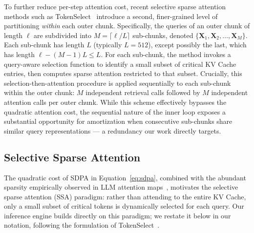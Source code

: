 \documentclass[10pt,conference]{IEEEtran}
\begin{document}
To further reduce per-step attention cost, recent selective sparse 
attention methods such as TokenSelect~\cite{tokenselect2025} introduce 
a second, finer-grained level of partitioning \textit{within} each 
outer chunk. Specifically, the queries of an outer chunk of length 
$\ell$ are subdivided into $M = \lceil \ell / L \rceil$ sub-chunks, 
denoted $\{\mathbf{X}_1, \mathbf{X}_2, \ldots, \mathbf{X}_M\}$. Each 
sub-chunk has length $L$ (typically $L = 512$), except possibly the 
last, which has length $\ell - (M-1)L \leq L$. For each sub-chunk, the 
method invokes a query-aware selection function to identify a small 
subset of critical KV Cache entries, then computes sparse attention 
restricted to that subset. Crucially, this selection-then-attention 
procedure is applied sequentially to each sub-chunk within 
the outer chunk: $M$ independent retrieval calls followed by $M$ 
independent attention calls per outer chunk. While this scheme 
effectively bypasses the quadratic attention cost, the sequential 
nature of the inner loop exposes a substantial opportunity for 
amortization when consecutive sub-chunks share similar query 
representations --- a redundancy our work directly targets.

\subsection{Selective Sparse Attention}
\label{subsec:problem-formulation}

The quadratic cost of SDPA in Equation~\eqref{eq:sdpa}, combined with
the abundant sparsity empirically observed in LLM attention
maps~\cite{xiao2024infllm, tang2024quest, tokenselect2025}, motivates
the selective sparse attention (SSA) paradigm: rather than attending to
the entire KV Cache, only a small subset of critical tokens is
dynamically selected for each query. Our inference engine builds directly
on this paradigm; we restate it below in our notation, following the
formulation of TokenSelect~\cite{tokenselect2025}.
\end{document}
